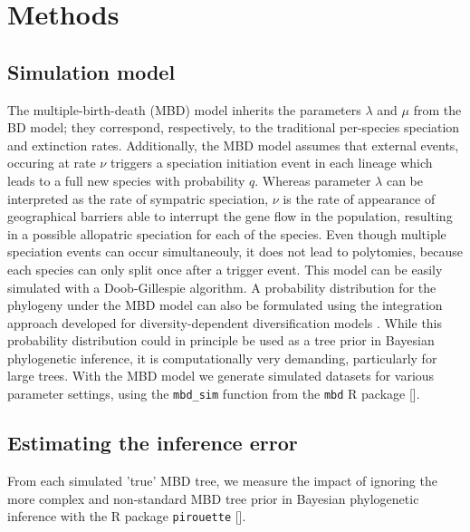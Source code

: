 \section{Methods}

\subsection{Simulation model}

The multiple-birth-death (MBD) model inherits the parameters $\lambda$ and $\mu$ from the BD model; they correspond, respectively, 
to the traditional per-species speciation and extinction rates. 
Additionally, the MBD model assumes that external events, occuring at rate $\nu$ triggers a speciation initiation event in each lineage which leads to a full new species with probability $q$. 
Whereas parameter $\lambda$ can be interpreted as the rate of sympatric speciation, $\nu$ is the rate of appearance of 
geographical barriers able to interrupt the gene flow in the population,
resulting in a possible allopatric speciation for each of the species.  
Even though multiple speciation events can occur simultaneouly, it does not lead to  
polytomies, because each species can only split once after a trigger event. This model can be easily simulated with a Doob-Gillespie algorithm. A probability distribution for the phylogeny under the MBD model can also be formulated using the integration approach developed for diversity-dependent diversification models \citep{etienne2012diversity}. While this probability distribution could in principle be used as a tree prior in Bayesian phylogenetic inference, it is computationally very demanding, particularly for large trees. With the MBD model we generate simulated datasets for various parameter settings, using the \verb;mbd_sim; function from the \verb;mbd; R package [\citep{mbd}].

\subsection{Estimating the inference error}

From each simulated 'true' MBD tree, we measure the impact of
ignoring the more complex and non-standard MBD tree prior in
Bayesian phylogenetic inference with the R package \verb;pirouette; [\citep{pirouette}].

